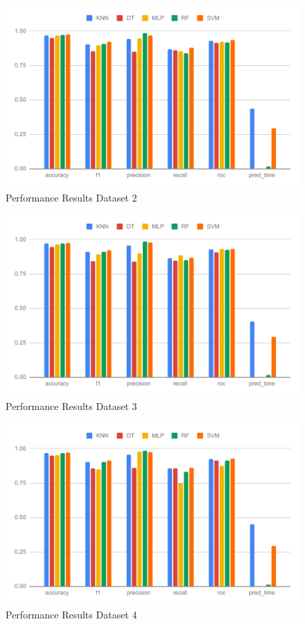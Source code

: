 \begin{figure}[ht]
    \centering
    \includegraphics[width=1.9\columnwidth]{media/ch_result_and_testing/perf_ds_2.pdf}
    \caption{Performance Results Dataset 2} \label{fig:perfromance_results_dataset_2}
\end{figure}

\begin{figure}[ht]
    \centering
    \includegraphics[width=1.9\columnwidth]{media/ch_result_and_testing/perf_ds_3.pdf}
    \caption{Performance Results Dataset 3} \label{fig:perfromance_results_dataset_3}
\end{figure}

\begin{figure}[ht]
    \centering
    \includegraphics[width=1.9\columnwidth]{media/ch_result_and_testing/perf_ds_4.pdf}
    \caption{Performance Results Dataset 4} \label{fig:perfromance_results_dataset_4}
\end{figure}

